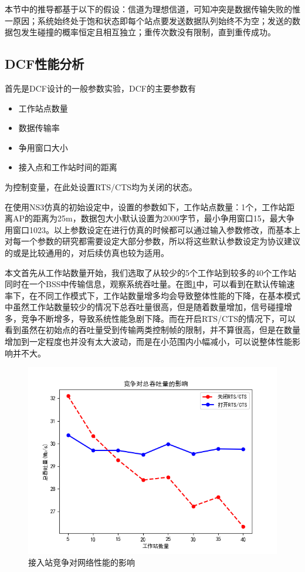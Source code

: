 \documentclass{article}
\begin{document}
本节中的推导都基于以下的假设：信道为理想信道，可知冲突是数据传输失败的惟一原因；系统始终处于饱和状态即每个站点要发送数据队列始终不为空；发送的数据包发生碰撞的概率恒定且相互独立；重传次数没有限制，直到重传成功。
\subsection{DCF性能分析}

首先是DCF设计的一般参数实验，DCF的主要参数有

\begin{itemize}
	\item {工作站点数量}
	\item {数据传输率}
	\item {争用窗口大小}
	\item {接入点和工作站时间的距离}
\end{itemize}

为控制变量，在此处设置RTS/CTS均为关闭的状态。

在使用NS3仿真的初始设定中，设置的参数如下，工作站点数量：1个，工作站距离AP的距离为25m，数据包大小默认设置为2000字节，最小争用窗口15，最大争用窗口1023。以上参数设定在进行仿真的时候都可以通过输入参数修改，而基本上对每一个参数的研究都需要设定大部分参数，所以将这些默认参数设定为协议建议的或是比较通用的，对后续仿真也较为适用。

本文首先从工作站数量开始，我们选取了从较少的5个工作站到较多的40个工作站同时在一个BSS中传输信息，观察系统吞吐量。在图\ref{fig:contention}中，可以看到在默认传输速率下，在不同工作模式下，工作站数量增多均会导致整体性能的下降，在基本模式中虽然工作站数量较少的情况下总吞吐量很高，但是随着数量增加，信号碰撞增多，竞争不断增多，导致系统性能急剧下降。而在开启RTS/CTS的情况下，可以看到虽然在初始点的吞吐量受到传输两类控制帧的限制，并不算很高，但是在数量增加到一定程度也并没有太大波动，而是在小范围内小幅减小，可以说整体性能影响并不大。
\begin{figure}[ht]
	\centering
	\includegraphics[scale=0.6]{picture/contention.png}
	\caption{接入站竞争对网络性能的影响}
	\label{fig:contention}
\end{figure}
\end{document}
